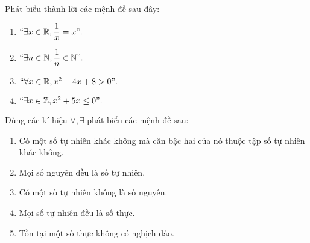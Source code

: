 \begin{bt}%
	Phát biểu thành lời các mệnh đề sau đây:
	\begin{enumerate}
		\item $ ``\exists x\in \mathbb{R}, \dfrac{1}{x}=x".$
		\item $ ``\exists n\in \mathbb{N}, \dfrac{1}{n}\in \mathbb{N}".$
		\item $ ``\forall x\in \mathbb{R}, x^2-4x+8>0".$
		\item $ ``\exists x\in \mathbb{Z}, x^2+5x\leq0".$
	\end{enumerate}
\end{bt}

\begin{bt}%
	Dùng các kí hiệu $\forall, \exists$ phát biểu các mệnh đề sau:
	\begin{enumerate}
		\item Có một số tự nhiên khác không mà căn bậc hai của nó thuộc tập số tự nhiên khác không.
		\item Mọi số nguyên đều là số tự nhiên.
		\item Có một số tự nhiên không là số nguyên.
		\item Mọi số tự nhiên đều là số thực.
		\item Tồn tại một số thực không có nghịch đảo.
	\end{enumerate}
\end{bt}

